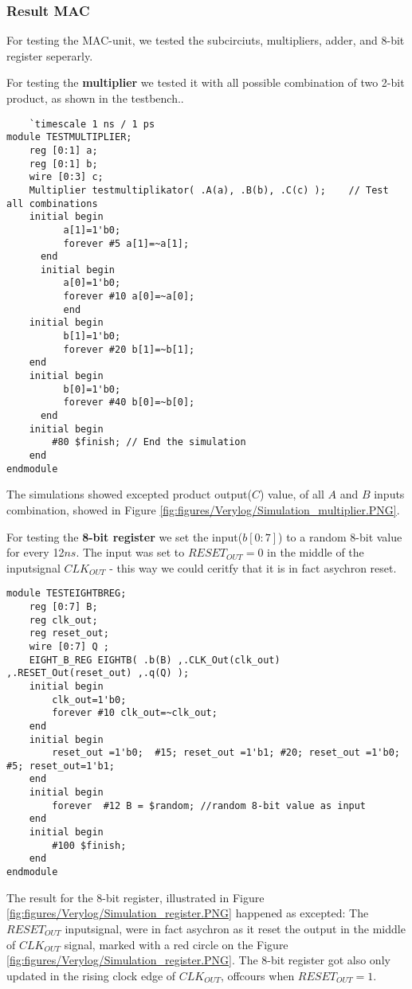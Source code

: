 \subsubsection{Result MAC}
For testing the MAC-unit, we tested the subcirciuts, multipliers, adder, and 8-bit register seperarly.

For testing the \textbf{multiplier} we tested it with all possible combination of two 2-bit product, as shown in the testbench.. 
\begin{lstlisting}
    `timescale 1 ns / 1 ps
module TESTMULTIPLIER;
	reg [0:1] a;  
	reg [0:1] b;
	wire [0:3] c;  
	Multiplier testmultiplikator( .A(a), .B(b), .C(c) );	// Test all combinations
  	initial begin
		  a[1]=1'b0; 
		  forever #5 a[1]=~a[1];
	  end
	  initial begin
		  a[0]=1'b0; 
		  forever #10 a[0]=~a[0];
		  end
	initial begin
		  b[1]=1'b0; 
		  forever #20 b[1]=~b[1];
	end 
	initial begin
		  b[0]=1'b0; 
		  forever #40 b[0]=~b[0];
	  end
	initial begin
		#80 $finish; // End the simulation
	end
endmodule
\end{lstlisting}

The simulations showed excepted product output($C$) value, of all $A$ and $B$ inputs combination, showed in Figure \ref{fig:figures/Verylog/Simulation_multiplier.PNG}.

For testing the \textbf{8-bit register} we set the input($b[0:7]$) to a random 8-bit value for every 12$ns$. The input was set to $RESET_{OUT}=0$ in the middle of the inputsignal $CLK_{OUT}$ - this way we could ceritfy that it is in fact asychron reset. 

\begin{lstlisting}
module TESTEIGHTBREG;
	reg [0:7] B;
	reg clk_out;
	reg reset_out; 
	wire [0:7] Q ;	
	EIGHT_B_REG EIGHTB( .b(B) ,.CLK_Out(clk_out) ,.RESET_Out(reset_out) ,.q(Q) ); 
	initial begin
		clk_out=1'b0;
		forever #10	clk_out=~clk_out;
	end	  
	initial begin
		reset_out =1'b0;  #15; reset_out =1'b1; #20; reset_out =1'b0; #5; reset_out=1'b1;
	end	 
	initial begin
  		forever	 #12 B = $random; //random 8-bit value as input
	end	
	initial begin
		#100 $finish;
	end	  
endmodule	
\end{lstlisting}

The result for the 8-bit register, illustrated in Figure  \ref{fig:figures/Verylog/Simulation_register.PNG} happened as excepted: The $RESET_{OUT}$ inputsignal, were in fact asychron as it reset the output in the middle of $CLK_{OUT}$ signal, marked with a red circle on the Figure \ref{fig:figures/Verylog/Simulation_register.PNG}. The 8-bit register got also only updated in the rising clock edge of $CLK_{OUT}$, offcours when $RESET_{OUT}=1$. 


